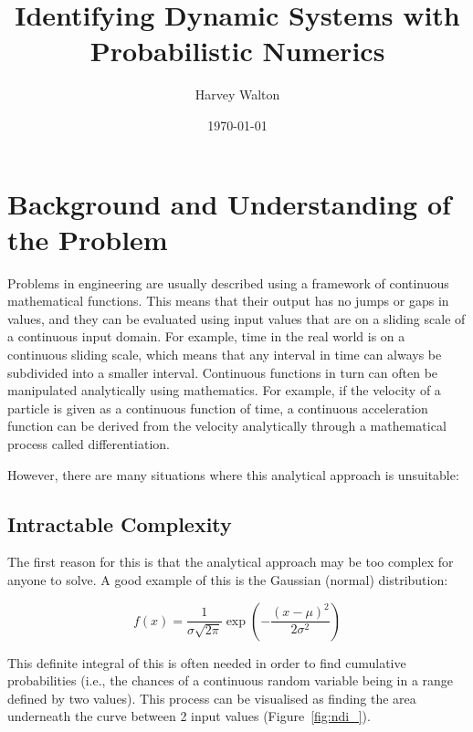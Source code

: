\documentclass[12pt]{article}
\title{Identifying Dynamic Systems with Probabilistic Numerics}
\author{Harvey Walton}
\date{\today}
\begin{document}

    \thispagestyle{empty}
    


    \tableofcontents
    \newpage


    \section{Background and Understanding of the Problem}


    Problems in engineering are usually described using a framework of continuous mathematical functions.
    This means that their output has no jumps or gaps in values, and they can be evaluated using input values that are on a sliding scale of a continuous input domain.
    For example, time in the real world is on a continuous sliding scale, which means that any interval in time can always be subdivided into a smaller interval.
    Continuous functions in turn can often be manipulated analytically using mathematics.
    For example, if the velocity of a particle is given as a continuous function of time, a continuous acceleration function can be derived from the velocity analytically through a mathematical process called differentiation.

    However, there are many situations where this analytical approach is unsuitable:

    \subsection{Intractable Complexity}

    The first reason for this is that the analytical approach may be too complex for anyone to solve.
    A good example of this is the Gaussian (normal) distribution\cite{NIST2023}:

    \begin{equation}
        f(x) = \frac{1}{\sigma\sqrt{2\pi}} \exp\left(-\frac{(x - \mu)^2}{2\sigma^2}\right)
    \end{equation}

    This definite integral of this is often needed in order to find cumulative probabilities (i.e., the chances of a continuous random variable being in a range defined by two values).
    This process can be visualised as finding the area underneath the curve between 2 input values (Figure~\ref{fig:ndi_}).
\end{document}
